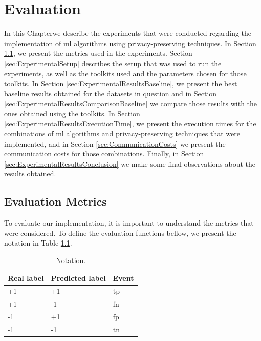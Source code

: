 %

\acresetall

\chapter{Evaluation}
\label{ch:Evaluation}

In this Chapterwe describe the experiments that were conducted regarding the implementation of \ac{ml} algorithms using privacy-preserving techniques. In Section \ref{sec:EvaluationMetrics}, we present the metrics used in the experiments. Section \ref{sec:ExperimentalSetup} describes the setup that was used to run the experiments, as well as the toolkits used and the parameters chosen for those toolkits. In Section \ref{sec:ExperimentalResultsBaseline}, we present the best baseline results obtained for the datasets in question and in Section \ref{sec:ExperimentalResultsComparisonBaseline} we compare those results with the ones obtained using the toolkits. In Section \ref{sec:ExperimentalResultsExecutionTime}, we present the execution times for the combinations of \ac{ml} algorithms and privacy-preserving techniques that were implemented, and in Section \ref{sec:CommunicationCosts} we present the communication costs for those combinations. Finally, in Section \ref{sec:ExperimentalResultsConclusion} we make some final observations about the results obtained.



\section{Evaluation Metrics}
\label{sec:EvaluationMetrics}

To evaluate our implementation, it is important to understand the metrics that were considered. To define the evaluation functions bellow, we present the notation in Table \ref{table:notation}. 

\begin{table}[htp]
\centering
\caption{Notation.}
\label{table:notation}
\begin{tabular}{|l|l|l|}
\hline
\textbf{Real label} & \textbf{Predicted label} & \textbf{Event} \\ \hline
 +1  &  +1  & \ac{tp}   \\ \hline
 +1  &  -1  & \ac{fn}   \\ \hline
 -1  &  +1  & \ac{fp}   \\ \hline
 -1  &  -1  & \ac{tn}   \\ \hline 
\end{tabular}
\end{table}

